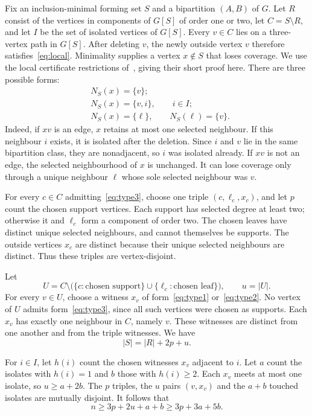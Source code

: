 \documentclass[11pt]{article}
\newcommand{\NS}{N_S}
\begin{document}
Fix an inclusion-minimal forming set $S$ and a bipartition $(A,B)$ of $G$.
Let $R$ consist of the vertices in components of $G[S]$ of order one or two,
let $C=S\setminus R$, and let $I$ be the set of isolated vertices of $G[S]$.
Every $v\in C$ lies on a three-vertex path in $G[S]$. After deleting $v$,
the newly outside vertex $v$ therefore satisfies~\eqref{eq:local}.
Minimality supplies a vertex $x\notin S$ that loses coverage. We use the
local certificate restrictions of~\cite[Section~5]{Sahbi}, giving their
short proof here. There are three possible forms:
\begin{align}
 &\NS(x)=\{v\};\label{eq:type1}\\
 &\NS(x)=\{v,i\},\qquad i\in I;\label{eq:type2}\\
 &\NS(x)=\{\ell\},\qquad \NS(\ell)=\{v\}.\label{eq:type3}
\end{align}
Indeed, if $xv$ is an edge, $x$ retains at most one selected neighbour.
If this neighbour $i$ exists, it is isolated after the deletion. Since
$i$ and $v$ lie in the same bipartition class, they are nonadjacent,
so $i$ was isolated already. If $xv$ is not an edge, the selected
neighbourhood of $x$ is unchanged. It can lose coverage only through a
unique neighbour $\ell$ whose sole selected neighbour was $v$.

For every $c\in C$ admitting~\eqref{eq:type3}, choose one triple
$(c,\ell_c,x_c)$, and let $p$ count the chosen support vertices. Each support has
selected degree at least two; otherwise it and $\ell_c$ form a component
of order two. The chosen leaves have distinct unique selected neighbours,
and cannot themselves be supports. The outside vertices $x_c$ are distinct
because their unique selected neighbours are distinct. Thus these triples
are vertex-disjoint.

Let
\[
 U=C\setminus\bigl(\{c:\text{chosen support}\}
                 \cup\{\ell_c:\text{chosen leaf}\}\bigr),
 \qquad u=|U|.
\]
For every $v\in U$, choose a witness $x_v$ of
form~\eqref{eq:type1} or~\eqref{eq:type2}. No vertex of $U$ admits
form~\eqref{eq:type3}, since all such vertices were chosen as supports.
Each $x_v$ has exactly one neighbour in $C$, namely $v$. These witnesses
are distinct from one another and from the triple witnesses. We have
\begin{equation}\label{eq:partition}
 |S|=|R|+2p+u.
\end{equation}

For $i\in I$, let $h(i)$ count the chosen witnesses $x_v$ adjacent to $i$.
Let $a$ count the isolates with $h(i)=1$ and $b$ those with $h(i)\ge2$.
Each $x_v$ meets at most one isolate, so $u\ge a+2b$. The $p$ triples,
the $u$ pairs $(v,x_v)$ and the $a+b$ touched isolates are mutually
disjoint. It follows that
\begin{equation}\label{eq:budget}
 n\ge3p+2u+a+b\ge3p+3a+5b.
\end{equation}
\end{document}

